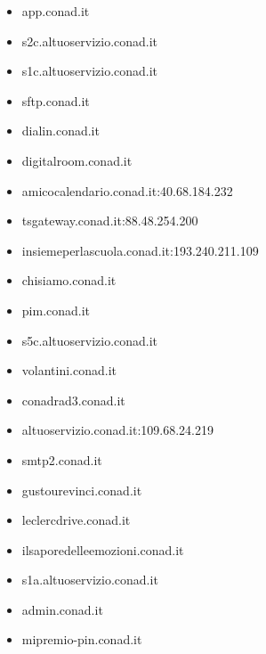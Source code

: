 \documentclass{article}
\begin{document}
\begin{itemize}
        \item app.conad.it
    
        \item s2c.altuoservizio.conad.it
    
        \item s1c.altuoservizio.conad.it
    
        \item sftp.conad.it
    
        \item dialin.conad.it
    
        \item digitalroom.conad.it
    
        \item amicocalendario.conad.it:40.68.184.232
    
        \item tsgateway.conad.it:88.48.254.200
    
        \item insiemeperlascuola.conad.it:193.240.211.109
    
        \item chisiamo.conad.it
    
        \item pim.conad.it
    
        \item s5c.altuoservizio.conad.it
    
        \item volantini.conad.it
    
        \item conadrad3.conad.it
    
        \item altuoservizio.conad.it:109.68.24.219
    
        \item smtp2.conad.it
    
        \item gustourevinci.conad.it
    
        \item leclercdrive.conad.it
    
        \item ilsaporedelleemozioni.conad.it
    
        \item s1a.altuoservizio.conad.it
    
        \item admin.conad.it
    
        \item mipremio-pin.conad.it
    

\end{itemize}
\end{document}

